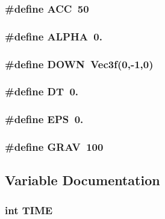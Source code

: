 \subsubsection[{A\-C\-C}]{\setlength{\rightskip}{0pt plus 5cm}\#define A\-C\-C~50}\label{phy_8h_a09fc148003f20ecc4834d4ea6aefb15c}
\subsubsection[{A\-L\-P\-H\-A}]{\setlength{\rightskip}{0pt plus 5cm}\#define A\-L\-P\-H\-A~0.}\label{phy_8h_af5abd28c44c29b7397c84f1fec4b1d84}
\subsubsection[{D\-O\-W\-N}]{\setlength{\rightskip}{0pt plus 5cm}\#define D\-O\-W\-N~{\bf Vec3f}(0,-\/1,0)}\label{phy_8h_a4193cd1c8c2e6ebd0e056fa2364a663f}
\subsubsection[{D\-T}]{\setlength{\rightskip}{0pt plus 5cm}\#define D\-T~0.}\label{phy_8h_a943f07034774ef1261d62cd0d3d1fec9}
\subsubsection[{E\-P\-S}]{\setlength{\rightskip}{0pt plus 5cm}\#define E\-P\-S~0.}\label{phy_8h_a6ebf6899d6c1c8b7b9d09be872c05aae}
\subsubsection[{G\-R\-A\-V}]{\setlength{\rightskip}{0pt plus 5cm}\#define G\-R\-A\-V~100}\label{phy_8h_a79c8dde443472e4dd71516faa49ca29e}


\subsection{Variable Documentation}
\subsubsection[{T\-I\-M\-E}]{\setlength{\rightskip}{0pt plus 5cm}int T\-I\-M\-E}\label{phy_8h_a256d466ef5a544c9fad1adb69ce28ca8}
